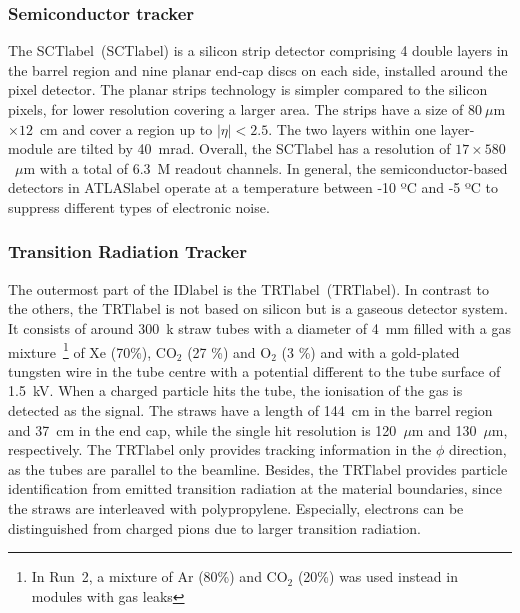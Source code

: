 
\subsubsection*{Semiconductor tracker}

The \acrlong{SCTlabel}~(\acrshort{SCTlabel}) is a silicon strip detector comprising 4 double layers in the barrel region and nine planar end-cap discs on each side, installed around the pixel detector. The planar strips technology is simpler compared to the silicon pixels, for lower resolution covering a larger area. The strips have a size of $80~\mu$m$\times 12$~cm and cover a region up to $|\eta|<2.5$. The two layers within one layer-module are tilted by 40~mrad. Overall, the \acrshort{SCTlabel} has a resolution of $17\times 580$~$\mu$m with a total of 6.3~M readout channels. In general, the semiconductor-based detectors in \acrshort{ATLASlabel} operate at a temperature between -10 ºC and -5 ºC to suppress different types of electronic noise.


\subsubsection*{Transition Radiation Tracker}

The outermost part of the \acrshort{IDlabel} is the \acrlong{TRTlabel}~(\acrshort{TRTlabel}). In contrast to the others, the \acrshort{TRTlabel} is not based on silicon but is a gaseous detector system. It consists of around 300~k straw tubes with a diameter of 4~mm filled with a gas mixture~\footnote{In Run~2, a mixture of Ar (80\%) and CO$_2$ (20\%) was used instead in modules with gas leaks} of Xe (70\%), CO$_2$ (27 \%) and O$_2$ (3 \%) and with a gold-plated tungsten wire in the tube centre with a potential different to the tube surface of 1.5~kV. When a charged particle hits the tube, the ionisation of the gas is detected as the signal. The straws have a length of 144~cm in the barrel region and 37~cm in the end cap, while the single hit resolution is 120~$\mu$m and 130~$\mu$m, respectively. The \acrshort{TRTlabel} only provides tracking information in the $\phi$ direction, as the tubes are parallel to the beamline. Besides, the \acrshort{TRTlabel} provides particle identification from emitted transition radiation at the material boundaries, since the straws are interleaved with polypropylene. Especially, electrons can be distinguished from charged pions due to larger transition radiation.

